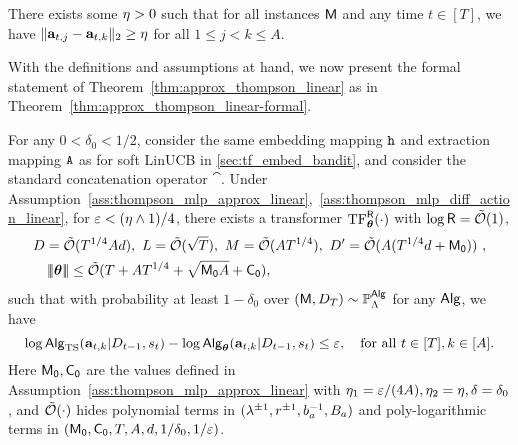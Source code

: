 \begin{assumption}\label{ass:thompson_mlp_diff_action_linear}
 There exists some ${\eta}>0$  such that for all instances ${\mathsf{M}}$ and any time $t\in[T]$, we have $\|{\mathbf a}_{t,j}-{\mathbf a}_{t,k}\|_2\geq{\eta}$ for all $1\leq j< k\leq A$.
\end{assumption}

With the definitions and assumptions at hand, we now present the formal statement of Theorem~\ref{thm:approx_thompson_linear} as in Theorem~\ref{thm:approx_thompson_linear-formal}.



\begin{theorem}\label{thm:approx_thompson_linear-formal}
For any $0<\delta_0<1/2$, consider the same embedding mapping ${\tt h}$ and extraction mapping ${\tt A}$ as for soft LinUCB in \ref{sec:tf_embed_bandit},
and consider the standard concatenation operator $\cat$. Under Assumption~\ref{ass:thompson_mlp_approx_linear},~\ref{ass:thompson_mlp_diff_action_linear}, for $\varepsilon<({\eta}\wedge1)/4$, there exists a  transformer ${\rm TF}_{\boldsymbol \theta}^{{\mathsf{R}}}(\cdot)$ with $\log {\mathsf{R}} = {\tilde{\mathcal O}}(1)$, 
\begin{align}
&D={\tilde{\mathcal O}}(T^{1/4}Ad),~L= {\tilde{\mathcal O}}(\sqrt{T}),~ M ={\tilde{\mathcal O}}(AT^{1/4}),~{D'}={\tilde{\mathcal O}}(A(T^{1/4}d+{\mathsf{M_0}}))~,\notag\\
&~~~{\left|\!\left|\!\left|{{\boldsymbol \theta}}\right|\!\right|\!\right|}\leq {\tilde{\mathcal O}}(T+AT^{1/4}+\sqrt{ {\mathsf{M_0}} A}+{{\mathsf{C_0}}}),\label{eq:ts_tf_param-formal}
\end{align} 
such that with probability at least $1-\delta_0$ over $({\mathsf{M}}, {D}_{{T}}) \sim \mathbb{P}_{{\Lambda}}^{{\mathsf{Alg}}}$ for any ${\mathsf{Alg}}$, we have
\[
\log {\mathsf{Alg}}_{{\mathrm{TS}}}({\mathbf a}_{t,k}|{D}_{t-1},{s}_t) - \log {\mathsf{Alg}}_{{{\boldsymbol \theta}}}({\mathbf a}_{t,k}|{D}_{t-1},{s}_t) \leq \varepsilon, ~~~ \text{for all } t\in[T],k\in[A].
\]
Here  ${\mathsf{M_0}},{{\mathsf{C_0}}}$ are the values defined in   Assumption~\ref{ass:thompson_mlp_approx_linear} with ${\eta_1}=\varepsilon/(4A),{\eta_2}={\eta},\delta=\delta_0$, and ${\tilde{\mathcal O}}(\cdot)$ hides polynomial terms in $(\lambda^{\pm1},{r}^{\pm1},b_a^{-1},B_a)$ and poly-logarithmic terms in $({\mathsf{M_0}},{{\mathsf{C_0}}},{T},A,d,1/\delta_0,1/\varepsilon)$.
\end{theorem}

